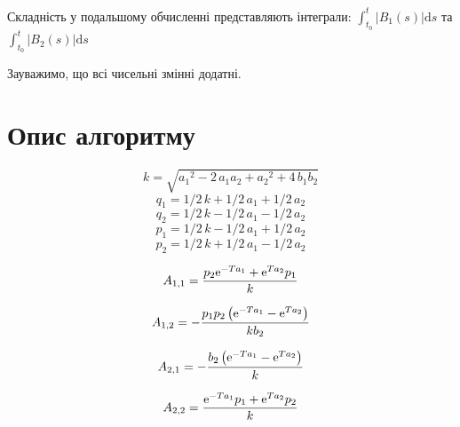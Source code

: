 \documentclass{article}
\begin{document}
Складність у подальшому обчисленні представляють інтеграли: $\int_{t_0}^t |B_1(s)|\mathrm{d}s$ та $\int_{t_0}^t|B_2(s)| \mathrm{d}s$

Зауважимо, що всі чисельні змінні додатні.

\section{Опис алгоритму}

\begin{equation}
{k}=\sqrt {{a_{{1}}}^{2}-2\,a_{{1}}a_{{2}}+{a_{{2}}}^{2}+4\,b_{{1}}b_{{2}}}
\end{equation}
\begin{equation}
q_{{1}}=1/2\,{k}+1/2\,a_{{1}}+1/2\,a_{{2}}
\end{equation}
\begin{equation}
q_{{2}}=1/2\,{k}-1/2\,a_{{1}}-1/2\,a_{{2}}
\end{equation}
\begin{equation}
p_{{1}}=1/2\,{k}-1/2\,a_{{1}}+1/2\,a_{{2}}
\end{equation}
\begin{equation}
p_{{2}}=1/2\,{k}+1/2\,a_{{1}}-1/2\,a_{{2}}
\end{equation}



\begin{equation}
A_{{1,1}}={\frac {p_{{2}}{{\rm e}^{-Ta_{{1}}}}+{{\rm e}^{Ta_{{2}}}}p_{{1}}}{k}}
\end{equation}

\begin{equation}
A_{{1,2}}=-{\frac {p_{{1}}p_{{2}} \left( {{\rm e}^{-Ta_{{1}}}}-{
{\rm e}^{Ta_{{2}}}} \right) }{kb_{{2}}}}
\end{equation}

\begin{equation}
A_{{2,1}}=-{\frac {b_{{2}} \left( {{\rm e}^{-Ta_{{1}}}}-{{\rm e}^{Ta_{
{2}}}} \right) }{k}}
\end{equation}

\begin{equation}
A_{{2,2}}={\frac {{{\rm e}^{-Ta_{{1}}}}p_{{1}}+{{\rm e}^{Ta_{{2}}}}p_{
{2}}}{k}}
\end{equation}
\end{document}
